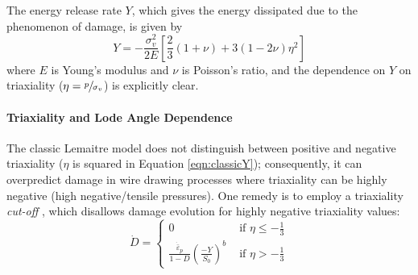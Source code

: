 \documentclass[sn-mathphys,Numbered]{sn-jnl}%
\newcommand{\bb}{\boldsymbol}
\begin{document}
The energy release rate $Y$, which gives the energy dissipated due to the phenomenon of damage, is given by \cite{lemaitre_engineering_2005}
\begin{equation} \label{eqn:classicY}
	Y
	=
	-\frac{\sigma_v^2}{2E}
	\left[
	\frac{2}{3} (1 + \nu) + 3 (1 - 2\nu) \eta^2
	\right]
\end{equation}
where $E$ is Young's modulus and $\nu$ is Poisson's ratio, and the dependence on $Y$ on triaxiality ($\eta = \sfrac{p}{\sigma_{v}}$) is explicitly clear.


\paragraph{Triaxiality and Lode Angle Dependence}

The classic Lemaitre model does not distinguish between positive and negative triaxiality ($\eta$ is squared in Equation \ref{eqn:classicY}); consequently, it can overpredict damage in wire drawing processes where triaxiality can be highly negative (high negative/tensile pressures).
One remedy is to employ a triaxiality \emph{cut-off} \cite{bouchard_enhanced_2011}, which disallows damage evolution for highly negative triaxiality values:
\begin{equation} \label{eq:triaxCutoff} %
	\dot{D} =
	\begin{cases}
		0 & \text { if } \eta \leq -\frac{1}{3}  \\
		\frac{\dot{\bar{\varepsilon}}_p}{1 - D}\left(\frac{-Y}{S_0}\right)^b 
		& \text { if } \eta>-\frac{1}{3}
	\end{cases}
\end{equation}
\end{document}
